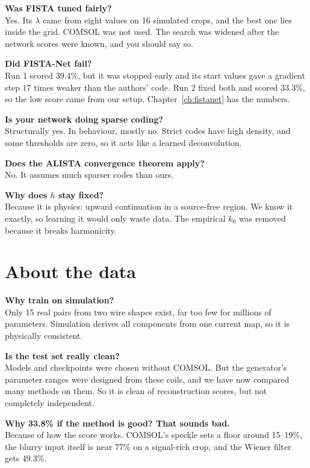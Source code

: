 \textbf{Was FISTA tuned fairly?}\\
Yes. Its $\lambda$ came from eight values on 16 simulated crops, and the best one lies inside the grid. COMSOL was not used. The
search was widened after the network scores were known, and you should say so.

\textbf{Did FISTA-Net fail?}\\
Run 1 scored 39.4\%, but it was stopped early and its start values gave a gradient step 17 times weaker than the authors' code.
Run 2 fixed both and scored 33.3\%, so the low score came from our setup. Chapter~\ref{ch:fistanet} has the numbers.

\textbf{Is your network doing sparse coding?}\\
Structurally yes. In behaviour, mostly no. Strict codes have high density, and some thresholds are zero, so it acts
like a learned deconvolution.

\textbf{Does the ALISTA convergence theorem apply?}\\
No. It assumes much sparser codes than ours.

\textbf{Why does $h$ stay fixed?}\\
Because it is physics: upward continuation in a source-free region. We know it exactly, so learning it would only
waste data. The empirical $k_0$ was removed because it breaks harmonicity.

\section{About the data}

\textbf{Why train on simulation?}\\
Only 15 real pairs from two wire shapes exist, far too few for millions of parameters. Simulation derives all
components from one current map, so it is physically consistent.

\textbf{Is the test set really clean?}\\
Models and checkpoints were chosen without COMSOL. But the generator's parameter ranges were designed from these coils,
and we have now compared many methods on them. So it is clean of reconstruction scores, but not completely independent.

\textbf{Why 33.8\% if the method is good? That sounds bad.}\\
Because of how the score works. COMSOL's speckle sets a floor around 15--19\%, the blurry input itself is near 77\% on a
signal-rich crop, and the Wiener filter gets 49.3\%.

